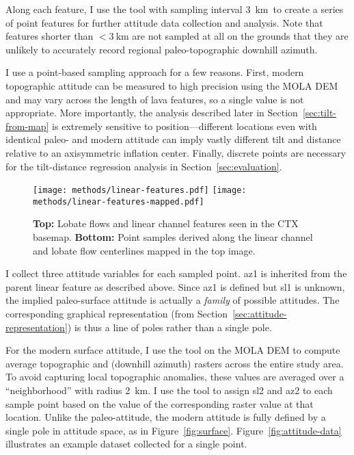 \newcommand{\samplinginterval}{\qty{3}{\km}}

Along each feature, I use the  tool with sampling interval \samplinginterval\ to create a series of point features for further attitude data collection and analysis. Note that features shorter than $<\samplinginterval$ are not sampled at all on the grounds that they are unlikely to accurately record regional paleo-topographic downhill azimuth.

I use a point-based sampling approach for a few reasons. First, modern topographic attitude can be measured to high precision using the \ac{MOLA} \ac{DEM} and may vary across the length of lava features, so a single value is not appropriate. More importantly, the analysis described later in Section~\ref{sec:tilt-from-map} is extremely sensitive to position---different locations even with identical paleo- and modern attitude can imply vastly different tilt and distance relative to an axisymmetric inflation center. Finally, discrete points are necessary for the tilt-distance regression analysis in Section~\ref{sec:evaluation}.

\begin{figure}
    \texttt{[image: methods/linear-features.pdf]}
    \texttt{[image: methods/linear-features-mapped.pdf]}
    \caption[Mapping linear features]{\textbf{Top:} Lobate flows and linear channel features seen in the \acs{CTX} basemap. \textbf{Bottom:} Point samples derived along the linear channel and lobate flow centerlines mapped in the top image.}%
    \label{fig:linear-features}
\end{figure}

\newcommand{\neighborhood}{\qty{2}{\km}}

I collect three attitude variables for each sampled point. \Acf{az1} is inherited from the parent linear feature as described above. Since \ac{az1} is defined but \acf{sl1} is unknown, the implied paleo-surface attitude is actually a \emph{family} of possible attitudes. The corresponding graphical representation (from Section~\ref{sec:attitude-representation}) is thus a line of poles rather than a single pole.

For the modern surface attitude, I use the  tool on the \ac{MOLA} \ac{DEM} to compute average topographic  and  (downhill azimuth) rasters across the entire study area. To avoid capturing local topographic anomalies, these values are averaged over a ``neighborhood'' with radius \neighborhood. I use the  tool to assign \acf{sl2} and \acf{az2} to each sample point based on the value of the corresponding raster value at that location. Unlike the paleo-attitude, the modern attitude is fully defined by a single pole in attitude space, as in Figure~\ref{fig:surface}. Figure~\ref{fig:attitude-data} illustrates an example dataset collected for a single point.

